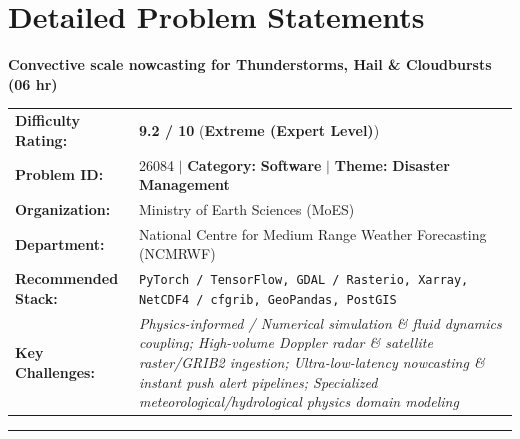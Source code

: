 \documentclass[10pt,a4paper]{article}
\begin{document}
\section{Detailed Problem Statements}

{}

\begin{tcolorbox}[pscard, title={"\textbf{SIH26084} \quad $\vert$ \quad Convective scale nowcasting for Thunderstorms, Hail \& Cloudbursts (06 hr)}]
\textbf{\large Convective scale nowcasting for Thunderstorms, Hail \& Cloudbursts (06 hr)}\\[0.25cm]

\begin{tabular}{@{}lp{12.5cm}@{}}
\textbf{Difficulty Rating:} & \textcolor{diffextreme}{\textbf{\Large 9.2 / 10}} \quad (\textbf{Extreme (Expert Level)}) \\
\textbf{Problem ID:} & 26084 \quad $\vert$ \quad \textbf{Category:} \textbf{Software} \quad $\vert$ \quad \textbf{Theme:} \textbf{Disaster Management} \\
\textbf{Organization:} & Ministry of Earth Sciences (MoES) \\
\textbf{Department:} & National Centre for Medium Range Weather Forecasting (NCMRWF) \\
\textbf{Recommended Stack:} & \texttt{PyTorch / TensorFlow, GDAL / Rasterio, Xarray, NetCDF4 / cfgrib, GeoPandas, PostGIS} \\
\textbf{Key Challenges:} & \textit{\small Physics-informed / Numerical simulation \& fluid dynamics coupling; High-volume Doppler radar \& satellite raster/GRIB2 ingestion; Ultra-low-latency nowcasting \& instant push alert pipelines; Specialized meteorological/hydrological physics domain modeling} \\
\end{tabular}

\vspace{0.2cm}
\hrule
\vspace{0.2cm}


\end{tcolorbox}
\end{document}
